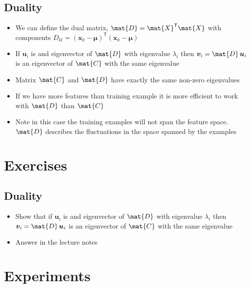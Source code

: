 \documentclass[11pt]{article}
\newcommand{\tr}{\textsf{T}}
\begin{document}
\subsection{Duality}
\label{sec:org322d87e}
\begin{itemize}
\item We can define the dual matrix, \(\mat{D}= \mat{X}^\tr\mat{X}\) with
components \(D_{kl} = (\bm{x}_k-\bm{\mu})^\tr(\bm{x}_k-\bm{\mu})\)
\item If \(\bm{u}_i\) is and eigenvector of \(\mat{D}\) with eigenvalue
\(\lambda_i\) then \(\bm{v}_i = \mat{D} \, \bm{u}_i\) is an
eigenvector of \(\mat{C}\) with the same eigenvalue
\item Matrix \(\mat{C}\) and \(\mat{D}\) have exactly the same non-zero
eigenvalues
\item If we have more features than training example it is more
efficient to work with \(\mat{D}\) than \(\mat{C}\)
\item Note in this case the training examples will not span the feature
space.  \(\mat{D}\) describes the fluctuations in the space spanned
by the examples
\end{itemize}

\section{Exercises}
\label{sec:org762cc53}

\subsection{Duality}
\label{sec:org054e483}
\begin{itemize}
\item Show that if \(\bm{u}_i\) is and eigenvector of \(\mat{D}\) with eigenvalue
\(\lambda_i\) then \(\bm{v}_i = \mat{D} \, \bm{u}_i\) is an
eigenvector of \(\mat{C}\) with the same eigenvalue
\item Answer in the lecture notes
\end{itemize}

\section{Experiments}
\label{sec:org81891da}
\end{document}
